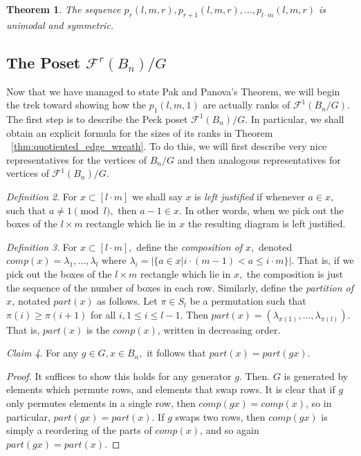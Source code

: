 \documentclass{amsart}
\newtheorem{thm}{Theorem}[subsection]
\theoremstyle{remark}
\newtheorem{defn}[thm]{Definition}
\newtheorem{claim}[thm]{Claim}
\newcommand\ssec{\subsection}
\begin{document}
\begin{thm}
\label{thm:pak_thm}
\cite[Theorem 1.1]{pak}
The sequence $p_r(l,m,r), p_{r+1}(l,m,r),\ldots, p_{l\cdot m}(l,m,r)$ is unimodal and symmetric.
\end{thm}

\ssec{The Poset $\mathcal F^r(B_n)/G$}
Now that we have managed to state Pak and Panova's Theorem, we will begin the trek toward showing how the $p_1(l,m,1)$ are actually ranks of $\mathcal F^1(B_n/G).$ The first step is to describe the Peck poset $\mathcal F^1(B_n)/G.$ In particular, we shall obtain an explicit formula for the sizes of its ranks in Theorem ~\ref{thm:quotiented_edge_wreath}. To do this, we will first describe very nice  representatives for the vertices of $B_n/G$ and then analogous representatives for vertices of $\mathcal F^1(B_n)/G.$

\begin{defn}
For $x \subset [l \cdot m]$ we shall say $x$ is {\it left justified} if whenever $a \in x,$ such that $a \neq 1 \pmod l,$ then $a -1 \in x.$ In other words, when we pick out the boxes of the $l\times m$ rectangle which lie in $x$ the resulting diagram is left justified.
\end{defn}

\begin{defn}
For $x \subset [l\cdot m],$ define the {\it composition of $x,$} denoted $comp(x) = \lambda_1 ,\ldots, \lambda_l$ where $\lambda_i = |\{a \in x|i\cdot (m-1)< a \leq i \cdot m\}|.$ That is, if we pick out the boxes of the $l \times m$ rectangle which lie in $x,$ the composition is just the sequence of the number of boxes in each row. Similarly, define the {\it partition of $x$,} notated $part(x)$ as follows. Let $\pi \in S_l$ be a permutation such that $\pi(i) \geq \pi(i+1)$ for all $i,1\leq i \leq l-1.$ Then  $part(x) = (\lambda_{\pi(1)},\ldots, \lambda_{\pi(l)}).$ That is, $part(x)$ is the $comp(x)$, written in decreasing order.
\end{defn}

\begin{claim}
\label{claim:comp_invariance}
For any $g \in G, x \in B_n,$ it follows that $part(x) = part(gx).$
\end{claim}
\begin{proof}
It suffices to show this holds for any generator $g.$ Then. $G$ is generated by elements which permute rows, and elements that swap rows. It is clear that if $g$ only permutes elements in a single row, then $comp(gx) = comp(x)$, so in particular, $part(gx) = part(x).$ If $g$ swaps two rows, then $comp(gx)$ is simply a reordering of the parts of $comp(x)$, and so again $part(gx) = part(x).$
\end{proof}
\end{document}
